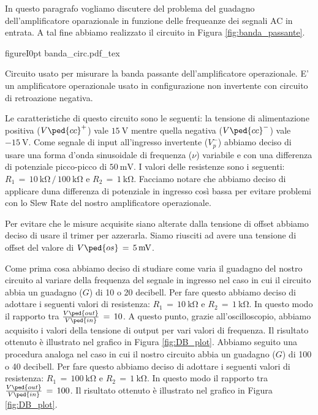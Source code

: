 In questo paragrafo vogliamo discutere del problema del guadagno dell'amplificatore oparazionale in funzione delle frequeanze dei segnali AC in entrata. A tal fine abbiamo realizzato il circuito in Figura \ref{fig:banda_passante}.


\begin{wrapfloat}{figure}{I}{0pt}
        \def\svgwidth{0.48\textwidth}
        {banda_circ.pdf_tex}
        \caption{Circuito usato per misurare la banda passante dell'amplificatore operazionale. E' un amplificatore operazionale usato in configurazione non invertente con circuito di retroazione negativa.}
        \label{fig:banda_passante}
\end{wrapfloat}

Le caratteristiche di questo circuito sono le seguenti: la tensione di alimentazione positiva ($V\ped{cc}^+$) vale $\SI{+15}{\volt}$ mentre quella negativa ($V\ped{cc}^-$) vale $\SI{-15}{\volt}$. Come segnale di input all'ingresso invertente ($V_p^-$) abbiamo deciso di usare una forma d'onda sinusoidale di frequenza ($\nu$) variabile e con una differenza di potenziale picco-picco di $\SI{50}{\milli\volt}$. I valori delle resistenze sono i seguenti: $R_1\,=\,\SI{10}{\kilo\ohm}\,/\,\SI{100}{\kilo\ohm}$ e $R_2\,=\,\SI{1}{\kilo\ohm}$. Facciamo notare che abbiamo deciso di applicare duna differenza di potenziale in ingresso così bassa per evitare problemi con lo Slew Rate del nostro amplificatore operazionale.

Per evitare che le misure acquisite siano alterate dalla tensione di offset abbiamo deciso di usare il trimer per azzerarla. Siamo riusciti ad avere una tensione di offset del valore di $V\ped{os}\,=\,\SI{5}{\milli\volt}$.

Come prima cosa abbiamo deciso di studiare come varia il guadagno del nostro circuito al variare della frequenza del segnale in ingresso nel caso in cui il circuito abbia un guadagno ($G$) di 10 o 20 decibell. Per fare questo abbiamo deciso di adottare i seguenti valori di resistenza: $R_1\,=\,\SI{10}{\kilo\ohm}$ e $R_2\,=\,\SI{1}{\kilo\ohm}$. In questo modo il rapporto tra $\frac{V\ped{out}}{V\ped{in}}\,=\,10$. A questo punto, grazie all'oscilloscopio, abbiamo acquisito i valori della tensione di output per vari valori di frequenza. Il risultato ottenuto è illustrato nel grafico in Figura \ref{fig:DB_plot}.
Abbiamo seguito una procedura analoga nel caso in cui il nostro circuito abbia un guadagno ($G$) di 100 o 40 decibell. Per fare questo abbiamo deciso di adottare i seguenti valori di resistenza: $R_1\,=\,\SI{100}{\kilo\ohm}$ e $R_2\,=\,\SI{1}{\kilo\ohm}$. In questo modo il rapporto tra $\frac{V\ped{out}}{V\ped{in}}\,=\,100$. Il risultato ottenuto è illustrato nel grafico in Figura \ref{fig:DB_plot}.

